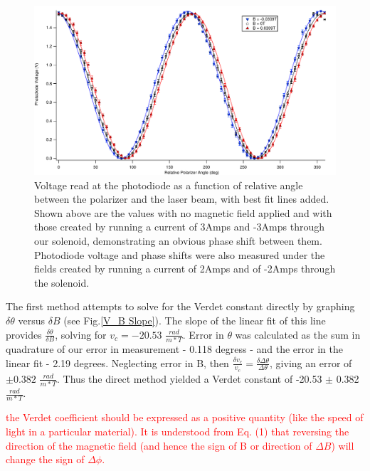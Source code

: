 \documentclass[prb,preprint]{revtex4-1}
\begin{document}
\begin{figure}[H]
\centering
\includegraphics[width=180mm]{FaradaySineWave.pdf}
\caption{Voltage read at the photodiode as a function of relative angle between the polarizer and the laser beam, with best fit lines added. Shown above are the values with no magnetic field applied and with those created by running a current of 3Amps and -3Amps through our solenoid, demonstrating an obvious phase shift between them. Photodiode voltage and phase shifts were also measured under the fields created by running a current of 2Amps and of -2Amps through the solenoid.}
\label{wave_plot}
\end{figure}

The first method attempts to solve for the Verdet constant directly by graphing $\delta \theta$ versus $\delta B$ (see Fig.\ref{V_B Slope}). The slope of the linear fit of this line provides $\frac{\delta \theta}{\delta B}$, solving for $v_c = -20.53$ $\frac{rad}{m*T}$. Error in $\theta$ was calculated as the sum in quadrature of our error in measurement - 0.118 degress - and the error in the linear fit - 2.19 degrees. Neglecting error in B, then $\frac{\delta v_c}{v_c} = \frac{\delta \Delta \theta}{\Delta \theta}$, giving an error of $\pm 0.382$ $\frac{rad}{m*T}$. Thus the direct method yielded a Verdet constant of -20.53 $\pm$ 0.382 $\frac{rad}{m*T}$.

\textcolor{red}{the Verdet coefficient should be expressed as a positive quantity (like the speed of light in a particular material). It is understood from Eq. (1) that reversing the direction of the magnetic field (and hence the sign of B or direction of $\Delta B$) will change the sign of $\Delta \phi$.} 
\end{document}
